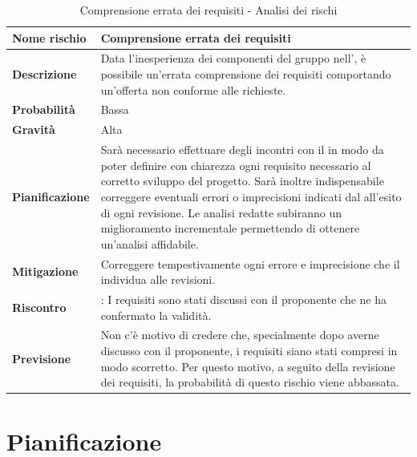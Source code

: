 \documentclass[12pt,a4paper]{article}
\begin{document}
\begin{table}[H]
	\begin{center}
		\begin{tabular}{p{} p{}}
			\toprule
			\textbf{Nome rischio} & \textbf{Comprensione errata dei requisiti} \\
			\midrule
			\midrule
			\textbf{Descrizione} & Data l’inesperienza dei componenti del gruppo nell’\AdR{}, è possibile un’errata comprensione dei requisiti comportando un’offerta non conforme alle richieste. \\
			\midrule
			\textbf{Probabilità} & Bassa \\
			\midrule
			\textbf{Gravità} & Alta \\
			\midrule
			\textbf{Pianificazione} &  Sarà necessario effettuare degli incontri con il \mgls{proponente} in modo da poter definire con chiarezza ogni requisito necessario al corretto sviluppo del progetto. Sarà inoltre indispensabile correggere eventuali errori o imprecisioni indicati dal \mgls{committente} all’esito di ogni revisione. Le analisi redatte subiranno un miglioramento incrementale permettendo di ottenere un’analisi affidabile. \\
			\midrule
			\textbf{Mitigazione} & Correggere tempestivamente ogni errore e imprecisione che il \mgls{committente} individua alle revisioni. \\
            \midrule
            \textbf{Riscontro} & \textbf{\FA{}}: I requisiti sono stati discussi con il proponente che ne ha confermato la validità. \\
            \midrule
            \textbf{Previsione} & Non c'è motivo di credere che, specialmente dopo averne discusso con il proponente, i requisiti siano stati compresi in modo scorretto. Per questo motivo, a seguito della revisione dei requisiti, la probabilità di questo rischio viene abbassata. \\
			\bottomrule
		\end{tabular}
		\caption{Comprensione errata dei requisiti - Analisi dei rischi}
	\end{center}
\end{table}

\newpage
\section{Pianificazione}
\end{document}
